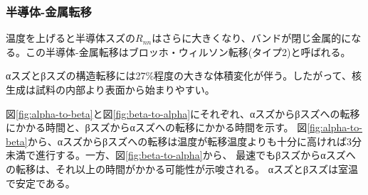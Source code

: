 \subsubsection{半導体-金属転移}
温度を上げると半導体スズの$R_{nn}$はさらに大きくなり、バンドが閉じ金属的になる。この半導体-金属転移はブロッホ・ウィルソン転移(タイプ2)と呼ばれる\cite{Yonezawa}。

αスズとβスズの構造転移には27\%程度の大きな体積変化が伴う。したがって、核生成は試料の内部より表面から始まりやすい\cite{Cornelius}。

図\ref{fig:alpha-to-beta}と図\ref{fig:beta-to-alpha}にそれぞれ、αスズからβスズへの転移にかかる時間と、βスズからαスズへの転移にかかる時間を示す\cite{Nogita}。
図\ref{fig:alpha-to-beta}から、αスズからβスズへの転移は温度が転移温度よりも十分に高ければ3分未満で進行する。一方、図\ref{fig:beta-to-alpha}から、
最速でもβスズからαスズへの転移は、それ以上の時間がかかる可能性が示唆される。
αスズとβスズは室温で安定である。
